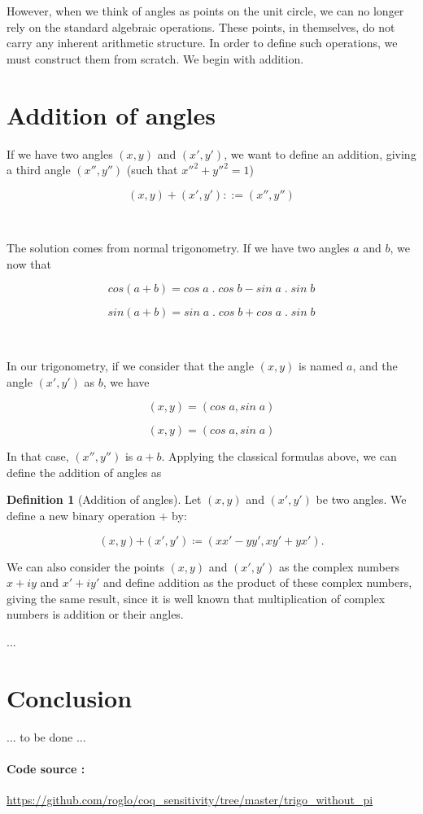 \documentclass[11pt]{article}
\theoremstyle{definition}
\newtheorem{definition}{Definition}[section]
\begin{document}
However, when we think of angles as points on the unit circle, we can
no longer rely on the standard algebraic operations. These points, in
themselves, do not carry any inherent arithmetic structure. In order
to define such operations, we must construct them from scratch. We
begin with addition.

\section{Addition of angles}

If we have two angles $(x, y)$ and $(x', y')$, we want to define an
addition, giving a third angle $(x'', y'')$ (such that
$x''^2+y''^2=1$)

\[
(x, y) + (x', y') ::= (x'', y'')
\]

\

\noindent The solution comes from normal trigonometry. If we have two
angles $a$ and $b$, we now that

\[
cos(a+b) = cos\;a\;.\;cos\;b - sin\;a\;.\;sin\;b
\]

\[
sin(a+b) = sin\;a\;.\;cos\;b + cos\;a\;.\;sin\;b
\]

\

\noindent In our trigonometry, if we consider that the angle $(x, y)$
is named $a$, and the angle $(x', y')$ as $b$, we have

\[
(x, y) = (cos\;a, sin\;a)
\]

\[
(x, y) = (cos\;a, sin\;a)
\]

\noindent In that case, $(x'', y'')$ is $a + b$.  Applying the
classical formulas above, we can define the addition of angles as

\begin{definition}[Addition of angles]

Let $(x, y)$ and $(x', y')$ be two angles. We define a new binary
operation $\boldsymbol{+}$ by:

\[
(x, y) \boldsymbol{+} (x', y') \coloneqq (x x' - y y', x y' + y x').
\]

\end{definition}

\noindent We can also consider the points $(x, y)$ and $(x', y')$ as
the complex numbers $x+iy$ and $x'+iy'$ and define addition as the
product of these complex numbers, giving the same result, since it is
well known that multiplication of complex numbers is addition or their
angles.

...

\section{Conclusion}

... to be done ...

\paragraph{Code source :}
\url{https://github.com/roglo/coq_sensitivity/tree/master/trigo_without_pi}
\end{document}
